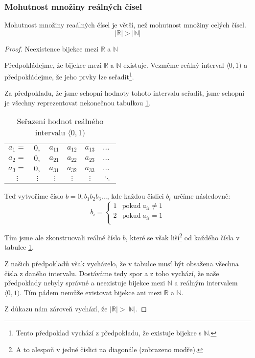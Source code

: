 \subsubsection*{Mohutnost množiny reálných čísel}
Mohutnost množiny reaálných čísel je větší, než mohutnost množiny celých čísel.
$$|\mathbb{R}| > |\mathbb{N}|$$
\begin{proof}
    Neexistence bijekce mezi $\mathbb{R}$ a $\mathbb{N}$

    Předpokládejme, že bijekce mezi $\mathbb{R}$ a $\mathbb{N}$ existuje.
    Vezměme reálný interval $\langle0, 1)$ a předpokládejme, že jeho prvky lze seřadit\footnote{Tento
    předpoklad vychází z předpokladu, že existuje bijekce s $\mathbb{N}$.}.

    Za předpokladu, že jsme schopni hodnoty tohoto intervalu seřadit, jsme schopni
    je všechny reprezentovat nekonečnou tabulkou \ref{tab:diag_real}.


\begin{table}[]
    \centering
    \begin{tabular}{cccccl}
    $a_1 = $ & $0,$     & \cellcolor[HTML]{3166FF}$a_{11}$ & $a_{12}$                         & $a_{13}$                         & $\dots$  \\
    $a_2 = $ & $0,$     & $a_{21}$                         & \cellcolor[HTML]{3166FF}$a_{22}$ & $a_{23}$                         & $\dots$  \\
    $a_3 = $ & $0,$     & $a_{31}$                         & $a_{32}$                         & \cellcolor[HTML]{3166FF}$a_{33}$ & $\dots$  \\
    $\vdots$ & $\vdots$ & $\vdots$                         & $\vdots$                         & $\vdots$                         & $\ddots$
    \end{tabular}
    \caption{Seřazení hodnot reálného intervalu $\langle 0, 1)$}
    \label{tab:diag_real}
\end{table}

    Teď vytvoříme číslo $b = 0,b_1 b_2 b_3 \ldots$, kde každou číslici $b_i$ určíme následovně:
    \[
    b_i =
    \left\{
    \begin{array}{ll}
        1 & \text{pokud} \; a_{ii} \neq 1\\
        2 & \text{pokud} \; a_{ii} = 1   \\
    \end{array}
    \right.
\]

    Tím jsme ale zkonstruovali reálné číslo $b$, které se však liší\footnote{A to alespoň v
    jedné číslici na diagonále (zobrazeno modře).} od každého čísla v tabulce
    \ref{tab:diag_real}.

    Z našich předpokladů však vycházelo, že v tabulce musí být obsažena všechna čísla z daného
    intervalu. Dostáváme tedy spor a z toho vychází, že naše předpoklady nebyly správné a
    neexistuje bijekce mezi $\mathbb{N}$ a reálným intervalem $\langle 0, 1)$. Tím pádem nemůže
    existovat bijekce ani mezi $\mathbb{R}$ a $\mathbb{N}$.

    Z důkazu nám zároveň vychází, že $|\mathbb{R}| > |\mathbb{N}|$.
\end{proof}

